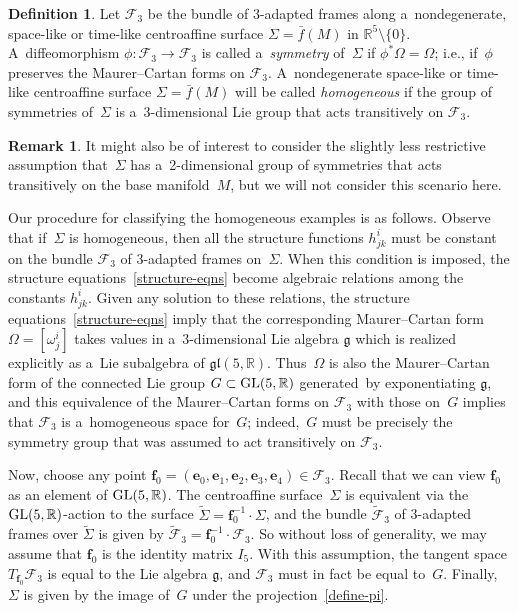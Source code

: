 \documentclass[10pt,a4paper]{amsart}
\numberwithin{equation}{section}
\theoremstyle{definition}
\newtheorem{dfn}[teo]{Definition}
\newtheorem{rmk}[teo]{Remark}
\begin{document}
\begin{dfn}
\label{homogeneous-def}
Let $\mathcal{F}_3$ be the bundle of 3-adapted frames along a~nondegenerate, space-like or time-like centroaf\/f\/ine surface
$\Sigma = \bar{f}(M)$ in $\mathbb{R}^5 \setminus \{0 \}$.
A~dif\/feomorphism $\phi:\mathcal{F}_3 \to \mathcal{F}_3$ is called a~{\em symmetry} of~$\Sigma$ if $\phi^*\Omega =
\Omega$; i.e., if~$\phi$ preserves the Maurer--Cartan forms on $\mathcal{F}_3$.
A~nondegenerate space-like or time-like centroaf\/f\/ine surface $\Sigma = \bar{f}(M)$ will be called {\em homogeneous} if the
group of symmetries of~$\Sigma$ is a~3-dimensional Lie group that acts transitively on $\mathcal{F}_3$.
\end{dfn}

\begin{rmk}
It might also be of interest to consider the slightly less restrictive assumption that~$\Sigma$ has a~2-dimensional
group of symmetries that acts transitively on the base manifold~$M$, but we will not consider this scenario here.
\end{rmk}

Our procedure for classifying the homogeneous examples is as follows.
Observe that if~$\Sigma$ is homogeneous, then all the structure functions $h^i_{jk}$ must be constant on the bundle
$\mathcal{F}_3$ of 3-adapted frames on~$\Sigma$.
When this condition is imposed, the structure equations~\eqref{structure-eqns} become algebraic relations among the
constants $h^i_{jk}$.
Given any solution to these relations, the structure equations~\eqref{structure-eqns} imply that the corresponding
Maurer--Cartan form $\Omega = [\omega^i_j]$ takes values in a~3-dimensional Lie algebra $\mathfrak{g}$ which is realized
explicitly as a~Lie subalgebra of $\mathfrak{gl}(5,\mathbb{R})$.
Thus~$\Omega$ is also the Maurer--Cartan form of the connected Lie group $G \subset {\rm GL}(5,\mathbb{R})$ generated~by
exponentiating $\mathfrak{g}$, and this equivalence of the Maurer--Cartan forms on $\mathcal{F}_3$ with those on~$G$
implies that $\mathcal{F}_3$ is a~homogeneous space for~$G$; indeed,~$G$ must be precisely the symmetry group that was
assumed to act transitively on $\mathcal{F}_3$.

Now, choose any point $\mathbf{f}_0 = (\mathbf{e}_0, \mathbf{e}_1, \mathbf{e}_2, \mathbf{e}_3, \mathbf{e}_4) \in
\mathcal{F}_3$.
Recall that we can view $\mathbf{f}_0$ as an element of ${\rm GL}(5,\mathbb{R})$.
The centroaf\/f\/ine surface~$\Sigma$ is equivalent via the ${\rm GL}(5,\mathbb{R})$-action to the surface
$\widetilde{\Sigma} = \mathbf{f}_0^{-1} \cdot \Sigma$, and the bundle $\widetilde{\mathcal{F}}_3$ of 3-adapted frames
over $\widetilde{\Sigma}$ is given by $\widetilde{\mathcal{F}}_3 = \mathbf{f}_0^{-1} \cdot \mathcal{F}_3$.
So without loss of generality, we may assume that $\mathbf{f}_0$ is the identity matrix $I_5$.
With this assumption, the tangent space $T_{\mathbf{f}_0}\mathcal{F}_3$ is equal to the Lie algebra $\mathfrak{g}$, and
$\mathcal{F}_3$ must in fact be equal to~$G$.
Finally,~$\Sigma$ is given by the image of~$G$ under the projection~\eqref{define-pi}.
\end{document}
